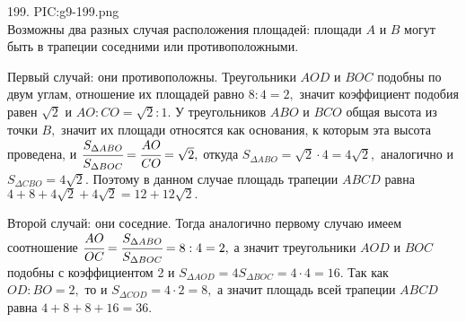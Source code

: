 199. {{PIC:g9-199.png}}\\
Возможны два разных случая расположения площадей: площади $A$ и $B$ могут быть в трапеции соседними или противоположными.

Первый случай: они противоположны. Треугольники $AOD$ и $BOC$ подобны по двум углам, отношение их площадей равно $8:4=2,$ значит коэффициент подобия равен $\sqrt{2}$ и $AO:CO=\sqrt{2}:1.$ У треугольников $ABO$ и $BCO$ общая высота из точки $B,$ значит их площади относятся как основания, к которым эта высота проведена, и $\cfrac{S_{\Delta ABO}}{S_{\Delta BOC}}=\cfrac{AO}{CO}=\sqrt{2},$ откуда $S_{\Delta ABO}=\sqrt{2}\cdot4=4\sqrt{2},$ аналогично и $S_{\Delta CBO}=4\sqrt{2}.$ Поэтому в данном случае площадь трапеции $ABCD$ равна $4+8+4\sqrt{2}+4\sqrt{2}=12+12\sqrt{2}.$

Второй случай: они соседние. Тогда аналогично первому случаю имеем соотношение $\cfrac{AO}{OC}=\cfrac{S_{\Delta ABO}}{S_{\Delta BOC}}=8:4=2,$ а значит треугольники $AOD$ и $BOC$ подобны с коэффициентом 2 и $S_{\Delta AOD}=4S_{\Delta BOC}=4\cdot4=16.$ Так как $OD:BO=2,$ то и $S_{\Delta COD}=4\cdot2=8,$ а значит площадь всей трапеции $ABCD$ равна $4+8+8+16=36.$\\
